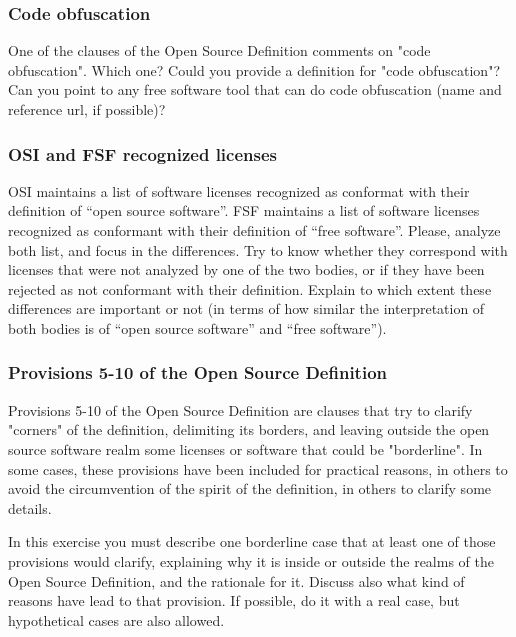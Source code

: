 \documentclass[a4paper]{article}
\begin{document}
\subsubsection{Code obfuscation}
\label{exe:code-obfuscation}

One of the clauses of the Open Source Definition comments on "code obfuscation". Which one? Could you provide a definition for "code obfuscation"? Can you point to any free software tool that can do code obfuscation (name and reference url, if possible)? 

\subsubsection{OSI and FSF recognized licenses}
\label{exe:osi-fsf-licenses}

OSI maintains a list of software licenses recognized as conformat with their definition of ``open source software''. FSF maintains a list of software licenses recognized as conformant with their definition of ``free software''. Please, analyze both list, and focus in the differences. Try to know whether they correspond with licenses that were not analyzed by one of the two bodies, or if they have been rejected as not conformant with their definition. Explain to which extent these differences are important or not (in terms of how similar the interpretation of both bodies is of ``open source software'' and ``free software''). 

\subsubsection{Provisions 5-10 of the Open Source Definition}
\label{exe:}

Provisions 5-10 of the Open Source Definition are clauses that try to clarify "corners" of the definition, delimiting its borders, and leaving outside the open source software realm some licenses or software that could be "borderline". In some cases, these provisions have been included for practical reasons, in others to avoid the circumvention of the spirit of the definition, in others to clarify some details.

In this exercise you must describe one borderline case that at least one of those provisions would clarify, explaining why it is inside or outside the realms of the Open Source Definition, and the rationale for it. Discuss also what kind of reasons have lead to that provision. If possible, do it with a real case, but hypothetical cases are also allowed.
\end{document}
